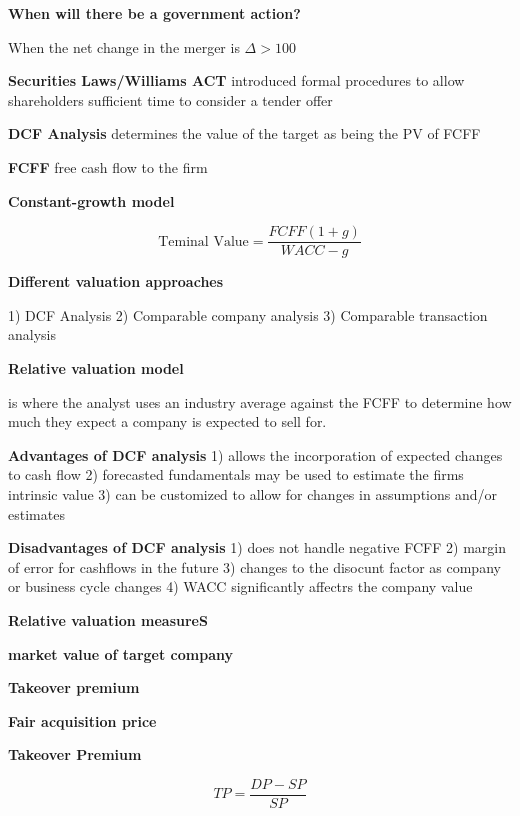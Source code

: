 \documentclass[12pt]{article}
\begin{document}
			\textbf{When will there be a government action?}
			
			When the net change in the merger is $\Delta > 100$
			
			\textbf{Securities Laws/Williams ACT} introduced formal procedures to allow shareholders sufficient time to consider a tender offer
			
			\textbf{DCF Analysis} determines the value of the target as being the PV of FCFF 
			
			\textbf{FCFF} free cash flow to the firm
			
			\textbf{Constant-growth model}
			
			$$
			\text{Teminal Value} = \dfrac{FCFF (1 + g)}{WACC - g}
			$$
			
			\textbf{Different valuation approaches}
			
			1) DCF Analysis
			2) Comparable company analysis
			3) Comparable transaction analysis
			
			\textbf{Relative valuation model}
			
			is where the analyst uses an industry average against the FCFF to determine how much they expect a company is expected to sell for.
			
			\textbf{Advantages of DCF analysis}
			1) allows the incorporation of expected changes to cash flow
			2) forecasted fundamentals may be used to estimate the firms intrinsic value
			3) can be customized to allow for changes in assumptions and/or estimates
			
			\textbf{Disadvantages of DCF analysis}
			1) does not handle negative FCFF
			2) margin of error for cashflows in the future
			3) changes to the disocunt factor as company or business cycle changes
			4) WACC significantly affectrs the company value
			
			\textbf{Relative valuation measureS}
			
			\textbf{market value of target company}
			
			\textbf{Takeover premium}
			
			\textbf{Fair acquisition price}
			
			\textbf{Takeover Premium}
			
			$$
			TP = \dfrac{DP - SP}{SP}
			$$
					
\end{document}

